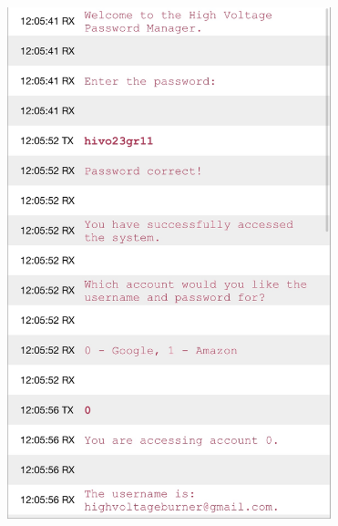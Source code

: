 \documentclass[12pt]{article}
\begin{document}
\begin{figure}[H]
\centering
\includegraphics[width=3.7in]{IMG_2453.jpg}

\end{figure}
\end{document}

